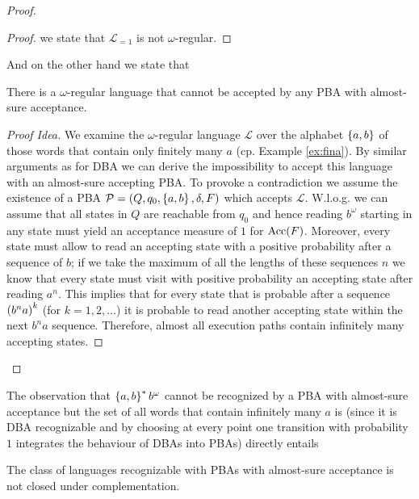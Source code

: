 \begin{proof}
\begin{proof}
    we state that $\mathcal{L}_{=1}$ is not $\omega$-regular.
  \end{proof}
  And on the other hand we state that
  \begin{lemma}
    \cite[Theorem 4.4.9 (b)]{Groesser}
    There is a $\omega$-regular language that cannot be accepted by any 
    \ac{PBA} with almost-sure acceptance.
  \end{lemma}
  \begin{proof}[Proof Idea]
    We examine the $\omega$-regular language $\mathcal{L}$ over the alphabet
    $\left\{a,b\right\}$ of those words that contain only finitely many $a$ (cp. Example
    \ref{ex:fina}). By similar arguments as for \ac{DBA} we can derive the
    impossibility to accept this language with an almost-sure accepting 
    \ac{PBA}. To provoke a contradiction we assume the existence of a \ac{PBA}
    $\mathcal{P} = \left(Q, q_{0}, \left\{a,b\right\}, \delta, F\right)$ which accepts 
    $\mathcal{L}$. W.l.o.g. we can assume that all states in $Q$ are reachable
    from $q_{0}$ and hence reading $b^{\omega}$ starting in any state must 
    yield an acceptance measure of $1$ for $\operatorname{Acc}(F)$. Moreover, every state 
    must allow to read an accepting state with a positive probability after a 
    sequence of $b$; if we take the maximum of all the lengths of these 
    sequences $n$ we know that every state must visit with positive probability
    an accepting state after reading $a^{n}$. This implies that for every state
    that is probable after a sequence $\left(b^{n}a\right)^{k}$ (for $k = 1, 2, 
    \dots$) it is probable to read another accepting state within the next 
    $b^{n}a$ sequence. Therefore, almost all execution paths contain infinitely 
    many accepting states.
  \end{proof}
\end{proof}
The observation that $\left\{a,b\right\}^{*}b^{\omega}$ cannot be recognized by a 
\ac{PBA} with almost-sure acceptance but the set of all words that contain 
infinitely many $a$ is (since it is \ac{DBA} recognizable and by choosing at
every point one transition with probability $1$ integrates the behaviour of
\acp{DBA} into \acp{PBA}) directly entails
\begin{proposition}
  The class of languages recognizable with \acp{PBA} with almost-sure 
  acceptance is not closed under complementation.
  \label{prop:pba=1complement}
\end{proposition}

